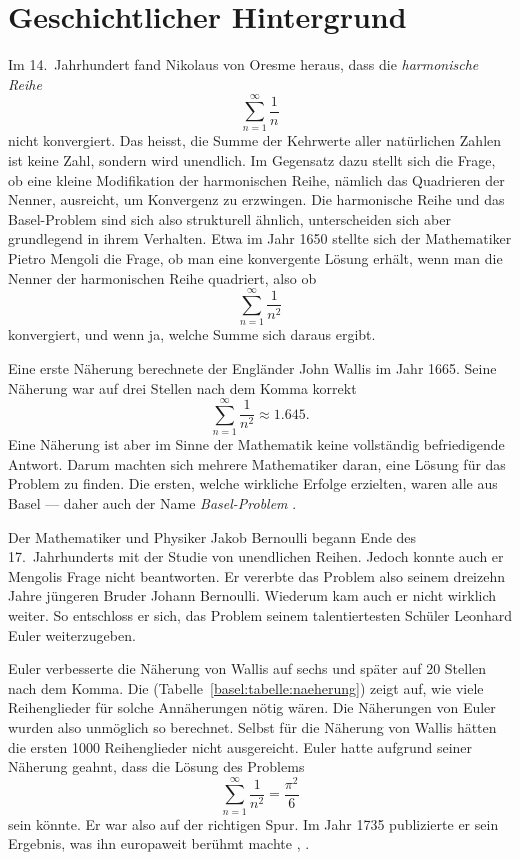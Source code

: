 %
%
%
%
\section{Geschichtlicher Hintergrund
\label{basel:section:geschichte}}
%
 
Im 14.~Jahrhundert fand Nikolaus von Oresme heraus, dass die
%
\emph{harmonische Reihe}
%
\[
    \sum_{n=1}^{\infty} \frac{1}{n}
\]
nicht konvergiert.
Das heisst, die Summe der Kehrwerte aller natürlichen Zahlen ist keine Zahl, sondern wird unendlich.
Im Gegensatz dazu stellt sich die Frage, ob eine kleine Modifikation der 
harmonischen Reihe, nämlich das Quadrieren der Nenner, ausreicht, 
um Konvergenz zu erzwingen. Die harmonische Reihe und das Basel-Problem 
sind sich also strukturell ähnlich, unterscheiden sich aber grundlegend 
in ihrem Verhalten.
Etwa im Jahr 1650 stellte sich der Mathematiker Pietro Mengoli die Frage, ob man eine
%
konvergente Lösung erhält, wenn man die Nenner der harmonischen Reihe quadriert, also ob
\[
    \sum_{n=1}^{\infty} \frac{1}{n^2}
\]
konvergiert, und wenn ja, welche Summe sich daraus ergibt.
 
Eine erste Näherung berechnete der Engländer John Wallis im Jahr 1665.
%
Seine Näherung war auf drei Stellen nach dem Komma korrekt
\[
    \sum_{n=1}^{\infty} \frac{1}{n^2} \approx 1.645.
\]
Eine Näherung ist aber im Sinne der Mathematik keine vollständig befriedigende Antwort.
Darum machten sich mehrere Mathematiker daran, eine Lösung für das Problem zu finden.
Die ersten, welche wirkliche Erfolge erzielten, waren alle aus Basel --- daher auch der Name
\emph{Basel-Problem} \cite{basel:YouTube}.
%
 
Der Mathematiker und Physiker Jakob Bernoulli begann Ende des 17.\ Jahrhunderts mit der
%
Studie von unendlichen Reihen.
Jedoch konnte auch er Mengolis Frage nicht beantworten.
Er vererbte das Problem also seinem dreizehn Jahre jüngeren Bruder Johann Bernoulli.
Wiederum kam auch er nicht wirklich weiter.
So entschloss er sich, das Problem seinem talentiertesten Schüler Leonhard Euler weiterzugeben.
 
Euler verbesserte die Näherung von Wallis auf sechs und später auf 20 Stellen nach dem Komma.
Die (Tabelle~\ref{basel:tabelle:naeherung}) zeigt auf, wie viele Reihenglieder für solche Annäherungen nötig wären.
Die Näherungen von Euler wurden also unmöglich so berechnet.
Selbst für die Näherung von Wallis hätten die ersten 1000 Reihenglieder nicht ausgereicht.
Euler hatte aufgrund seiner Näherung geahnt, dass die Lösung des Problems
\[
    \sum_{n=1}^{\infty} \frac{1}{n^2} = \frac{\pi^2}{6}
\]
sein könnte.
Er war also auf der richtigen Spur.
Im Jahr 1735 publizierte er sein Ergebnis, was ihn europaweit berühmt machte \cite{basel:YouTube}, \cite{basel:Wikipedia}.
 
